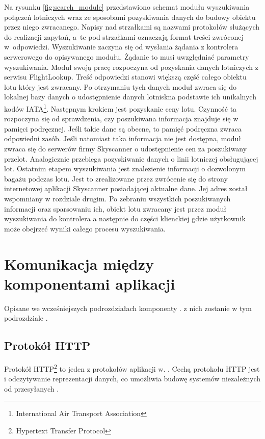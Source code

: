 \documentclass[12pt, twoside]{report}
\begin{document}
Na rysunku \ref{fig:search_module} przedstawiono schemat modułu wyszukiwania połączeń lotniczych wraz ze sposobami pozyskiwania danych do budowy obiektu przez niego zwracanego.
Napisy nad strzałkami są nazwami protokołów służących do realizacji zapytań, a~te pod strzałkami oznaczają format treści zwróconej w~odpowiedzi. Wyszukiwanie zaczyna się od wysłania żądania z kontrolera serwerowego do opisywanego modułu. Żądanie to musi uwzględniać  parametry wyszukiwania. Moduł swoją pracę rozpoczyna od pozyskania danych lotniczych z serwisu FlightLookup. Treść odpowiedzi stanowi większą część całego obiektu lotu który jest zwracany. Po otrzymaniu tych danych moduł zwraca się do lokalnej bazy danych o udostępnienie danych lotniskna podstawie ich unikalnych kodów IATA\footnote{International Air Transport Association}. Następnym krokiem jest pozyskanie ceny lotu. Czynność ta rozpoczyna się od sprawdzenia, czy poszukiwana informacja znajduje się w pamięci podręcznej. Jeśli takie dane są obecne, to pamięć podręczna zwraca odpowiedni zasób. Jeśli natomiast taka informacja nie jest dostępna, moduł zwraca się do serwerów firmy Skyscanner o udostępnienie cen za poszukiwany przelot. Analogicznie przebiega pozyskiwanie danych o linii lotniczej obsługującej lot. Ostatnim etapem wyszukiwania jest znalezienie informacji o dozwolonym bagażu podczas lotu. Jest to zrealizowane przez zwrócenie się do strony internetowej aplikacji Skyscanner posiadającej aktualne dane. Jej adres został wspomniany w rozdziale drugim. Po zebraniu wszystkich poszukiwanych informacji oraz sparsowaniu ich, obiekt lotu zwracany jest przez moduł wyszukiwania do kontrolera a następnie do części klienckiej gdzie użytkownik może obejrzeć wyniki całego procesu wyszukiwania.

\section{Komunikacja między komponentami aplikacji}
Opisane we wcześniejszych podrozdziałach komponenty .  z nich zostanie  w tym podrozdziale . 

\subsection{Protokół HTTP}
Protokół HTTP\footnote{Hypertext Transfer Protocol} to jeden z   protokołów aplikacji w. \cite{http}. Cechą protokołu HTTP jest  i odczytywanie reprezentacji danych, co umożliwia budowę systemów niezależnych od przesyłanych .
 
\end{document}
